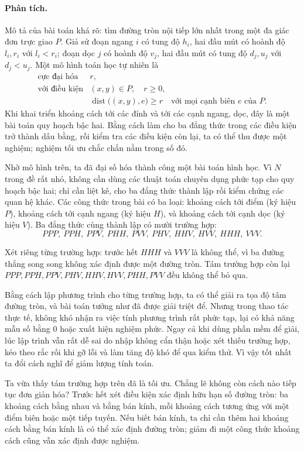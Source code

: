 \documentclass[11pt]{article}
\newcommand{\dist}{\operatorname{dist}}
\begin{document}
\paragraph{Phân tích.}
Mô tả của bài toán khá rõ: tìm đường tròn nội tiếp lớn nhất trong một đa giác
đơn trực giao \(P\). Giả sử đoạn ngang \(i\) có tung độ \(h_i\), hai đầu mút
có hoành độ \(l_i,r_i\) với \(l_i<r_i\); đoạn dọc \(j\) có hoành độ \(v_j\),
hai đầu mút có tung độ \(d_j,u_j\) với \(d_j<u_j\). Một mô hình toán học tự
nhiên là
\[
\begin{array}{ll}
\text{cực đại hóa} & r,\\[0.2em]
\text{với điều kiện} & (x,y)\in P,\quad r\ge 0,\\
& \dist\bigl((x,y),e\bigr)\ge r
  \quad\text{với mọi cạnh biên } e \text{ của } P.
\end{array}
\]
Khi khai triển khoảng cách tới các đỉnh và tới các cạnh ngang, dọc, đây là
một bài toán quy hoạch bậc hai. Bằng cách làm cho ba đẳng thức trong các điều
kiện trở thành dấu bằng, rồi kiểm tra các điều kiện còn lại, ta có thể thu
được một nghiệm; nghiệm tối ưu chắc chắn nằm trong số đó.

Nhờ mô hình trên, ta đã đại số hóa thành công một bài toán hình học. Vì
\(N\) trong đề rất nhỏ, không cần dùng các thuật toán chuyên dụng phức tạp cho
quy hoạch bậc hai; chỉ cần liệt kê, cho ba đẳng thức thành lập rồi kiểm chứng
các quan hệ khác. Các công thức trong bài có ba loại: khoảng cách tới điểm
(ký hiệu \(P\)), khoảng cách tới cạnh ngang (ký hiệu \(H\)), và khoảng cách
tới cạnh dọc (ký hiệu \(V\)). Ba đẳng thức cùng thành lập có mười trường hợp:
\[
  PPP,\ PPH,\ PPV,\ PHH,\ PVV,\ PHV,\ HHV,\ HVV,\ HHH,\ VVV.
\]

Xét riêng từng trường hợp: trước hết \(HHH\) và \(VVV\) là không thể, vì ba
đường thẳng song song không xác định được một đường tròn. Tám trường hợp còn
lại \(PPP,PPH,PPV,PHV,HHV,HVV,PHH,PVV\) đều không thể bỏ qua.

Bằng cách lập phương trình cho từng trường hợp, ta có thể giải ra tọa độ tâm
đường tròn, và bài toán tưởng như đã được giải triệt để. Nhưng trong thao tác
thực tế, không khó nhận ra việc tính phương trình rất phức tạp, lại có khả
năng mẫu số bằng \(0\) hoặc xuất hiện nghiệm phức. Ngay cả khi dùng phần mềm
để giải, lúc lập trình vẫn rất dễ sai do nhập không cẩn thận hoặc xét thiếu
trường hợp, kéo theo rắc rối khi gỡ lỗi và làm tăng độ khó để qua kiểm thử.
Vì vậy tốt nhất ta đổi cách nghĩ để giảm lượng tính toán.

Ta vừa thấy tám trường hợp trên đã là tối ưu. Chẳng lẽ không còn cách nào
tiếp tục đơn giản hóa? Trước hết xét điều kiện xác định hữu hạn số đường
tròn: ba khoảng cách bằng nhau và bằng bán kính, mỗi khoảng cách tương ứng
với một điểm biên hoặc một tiếp tuyến. Nếu biết bán kính, ta chỉ cần thêm hai
khoảng cách bằng bán kính là có thể xác định đường tròn; giảm đi một công
thức khoảng cách cũng vẫn xác định được nghiệm.
\end{document}
